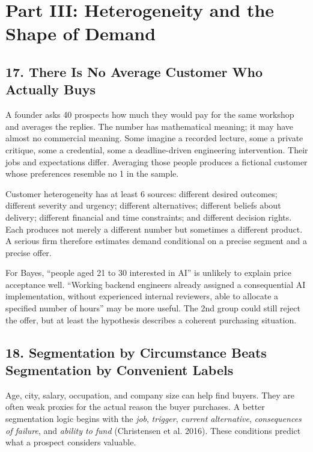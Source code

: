 \section*{Part III: Heterogeneity and the Shape of Demand}

\subsection*{17. There Is No Average Customer Who Actually Buys}

A founder asks 40 prospects how much they would pay for the same workshop and averages the replies. The number has mathematical meaning; it may have almost no commercial meaning. Some imagine a recorded lecture, some a private critique, some a credential, some a deadline-driven engineering intervention. Their jobs and expectations differ. Averaging those people produces a fictional customer whose preferences resemble no 1 in the sample.

Customer heterogeneity has at least 6 sources: different desired outcomes; different severity and urgency; different alternatives; different beliefs about delivery; different financial and time constraints; and different decision rights. Each produces not merely a different number but sometimes a different product. A serious firm therefore estimates demand conditional on a precise segment and a precise offer.

For Bayes, ``people aged 21 to 30 interested in AI'' is unlikely to explain price acceptance well. ``Working backend engineers already assigned a consequential AI implementation, without experienced internal reviewers, able to allocate a specified number of hours'' may be more useful. The 2nd group could still reject the offer, but at least the hypothesis describes a coherent purchasing situation.

\subsection*{18. Segmentation by Circumstance Beats Segmentation by Convenient Labels}

Age, city, salary, occupation, and company size can help find buyers. They are often weak proxies for the actual reason the buyer purchases. A better segmentation logic begins with the \emph{job}, \emph{trigger}, \emph{current alternative}, \emph{consequences of failure}, and \emph{ability to fund} (Christensen et al. 2016). These conditions predict what a prospect considers valuable.

